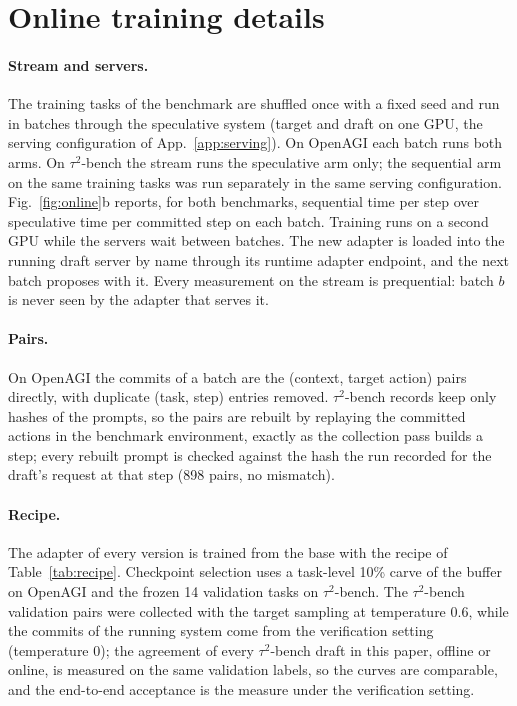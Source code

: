 \section{Online training details}
\label{app:online}
\paragraph{Stream and servers.} The training tasks of the benchmark are shuffled once with a fixed seed and
run in batches through the speculative system (target and draft on one GPU, the serving configuration of
App.~\ref{app:serving}). On OpenAGI each batch runs both arms. On $\tau^2$-bench the stream runs the
speculative arm only; the sequential arm on the same training tasks was run separately in the same serving
configuration. Fig.~\ref{fig:online}b reports, for both benchmarks, sequential time per step over speculative time
per committed step on each batch. Training runs on a second GPU while the servers wait between batches. The new adapter is
loaded into the running draft server by name through its runtime adapter endpoint, and the next batch proposes
with it. Every measurement on the stream is prequential: batch $b$ is never seen by the adapter that serves it.

\paragraph{Pairs.} On OpenAGI the commits of a batch are the (context, target action) pairs directly, with
duplicate (task, step) entries removed. $\tau^2$-bench records keep only hashes of the prompts, so the pairs are
rebuilt by replaying the committed actions in the benchmark environment, exactly as the collection pass
builds a step; every rebuilt prompt is checked against the hash the run recorded for the draft's request at
that step (898 pairs, no mismatch).

\paragraph{Recipe.} The adapter of every version is trained from the base with the recipe of
Table~\ref{tab:recipe}. Checkpoint selection uses a task-level 10\% carve of the buffer on OpenAGI and the
frozen 14 validation tasks on $\tau^2$-bench. The $\tau^2$-bench validation pairs were collected with the target sampling at
temperature 0.6, while the commits of the running system come from the verification setting (temperature 0);
the agreement of every $\tau^2$-bench draft in this paper, offline or online, is measured on the same validation
labels, so the curves are comparable, and the end-to-end acceptance is the measure under the verification
setting.

